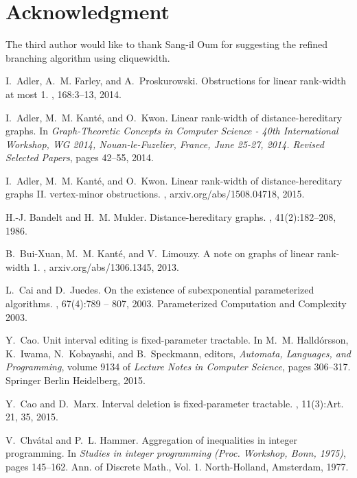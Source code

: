 \documentclass[11pt]{article}
\theoremstyle{remark}
\begin{document}
\section*{Acknowledgment}
The third author would like to thank Sang-il Oum for suggesting the refined branching algorithm using cliquewidth.

\begin{thebibliography}{10}

I.~Adler, A.~M. Farley, and A.~Proskurowski.
\newblock Obstructions for linear rank-width at most 1.
, 168:3--13, 2014.

I.~Adler, M.~M. Kant{\'{e}}, and O.~Kwon.
\newblock Linear rank-width of distance-hereditary graphs.
\newblock In {\em Graph-Theoretic Concepts in Computer Science - 40th
  International Workshop, {WG} 2014, Nouan-le-Fuzelier, France, June 25-27,
  2014. Revised Selected Papers}, pages 42--55, 2014.

I.~Adler, M.~M. Kant\'e, and O.~Kwon.
\newblock Linear rank-width of distance-hereditary graphs {II}. vertex-minor
  obstructions.
, arxiv.org/abs/1508.04718, 2015.

H.-J. Bandelt and H.~M. Mulder.
\newblock Distance-hereditary graphs.
, 41(2):182--208, 1986.

B.~Bui{-}Xuan, M.~M. Kant{\'{e}}, and V.~Limouzy.
\newblock A note on graphs of linear rank-width 1.
, arxiv.org/abs/1306.1345, 2013.

L.~Cai and D.~Juedes.
\newblock On the existence of subexponential parameterized algorithms.
, 67(4):789 -- 807,
  2003.
\newblock Parameterized Computation and Complexity 2003.

Y.~Cao.
\newblock Unit interval editing is fixed-parameter tractable.
\newblock In M.~M. Halldórsson, K.~Iwama, N.~Kobayashi, and B.~Speckmann,
  editors, {\em Automata, Languages, and Programming}, volume 9134 of {\em
  Lecture Notes in Computer Science}, pages 306--317. Springer Berlin
  Heidelberg, 2015.

Y.~Cao and D.~Marx.
\newblock Interval deletion is fixed-parameter tractable.
, 11(3):Art. 21, 35, 2015.

V.~Chv{\'a}tal and P.~L. Hammer.
\newblock Aggregation of inequalities in integer programming.
\newblock In {\em Studies in integer programming ({P}roc. {W}orkshop, {B}onn,
  1975)}, pages 145--162. Ann. of Discrete Math., Vol. 1. North-Holland,
  Amsterdam, 1977.


\end{thebibliography}
\end{document}
